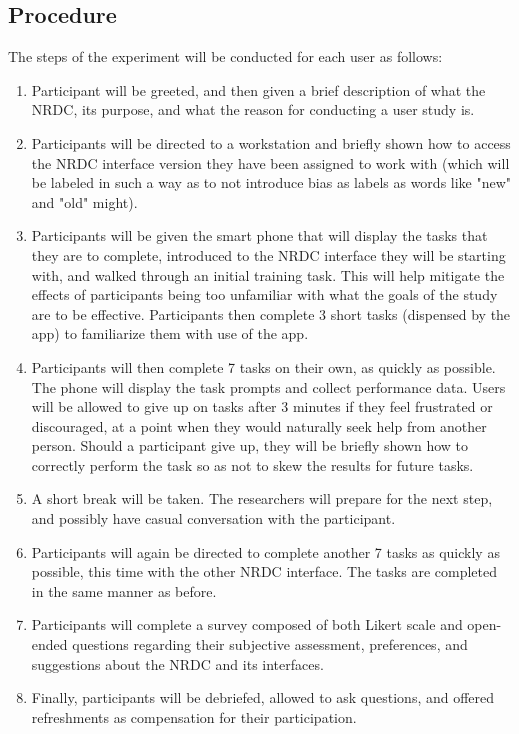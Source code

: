 \documentclass{article}
\begin{document}
\subsection{Procedure}
The steps of the experiment will be conducted for each user as follows:
\begin{enumerate}
\item Participant will be greeted, and then given a brief description of what the NRDC, its purpose, and what the reason for conducting a user study is.

\item Participants will be directed to a workstation and briefly shown how to access the NRDC interface version they have been assigned to work with (which will be labeled in such a way as to not introduce bias as labels as words like "new" and "old" might).

\item Participants will be given the smart phone that will display the tasks that they are to complete, introduced to the NRDC interface they will be starting with, and walked through an initial training task. This will help mitigate the effects of participants being too unfamiliar with what the goals of the study are to be effective. Participants then complete 3 short tasks (dispensed by the app) to familiarize them with use of the app.

\item Participants will then complete 7 tasks on their own, as quickly as possible. The phone will display the task prompts and collect performance data. Users will be allowed to give up on tasks after 3 minutes if they feel frustrated or discouraged, at a point when they would naturally seek help from another person. Should a participant give up, they will be briefly shown how to correctly perform the task so as not to skew the results for future tasks.

\item A short break will be taken. The researchers will prepare for the next step, and possibly have casual conversation with the participant.

\item Participants will again be directed to complete another 7 tasks as quickly as possible, this time with the other NRDC interface. The tasks are completed in the same manner as before.

\item Participants will complete a survey composed of both Likert scale and open-ended questions regarding their subjective assessment, preferences, and suggestions about the NRDC and its interfaces.

\item Finally, participants will be debriefed, allowed to ask questions, and offered refreshments as compensation for their participation.
%
\end{enumerate}
\end{document}
